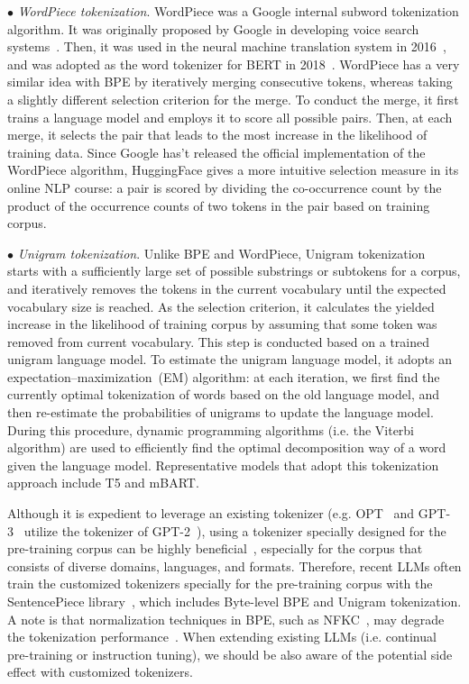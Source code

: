 $\bullet$ \emph{WordPiece tokenization}.  WordPiece was a Google internal subword tokenization algorithm. It was originally proposed by Google in developing voice search systems~\cite{Mike-ICASSP-2012-Japanese}. Then, it was  used in the neural machine translation system in 2016~\cite{Wu-CoRR-2016}, and  was adopted as the word tokenizer for BERT in 2018~\cite{Devlin-NAACL-2019-BERT}.  WordPiece has a very similar idea with BPE by iteratively merging consecutive tokens, whereas taking a slightly different  selection criterion for the merge. To conduct the merge, it first trains a language model and  employs it to score all possible pairs. Then, at each merge, it selects the pair that leads to the most increase in the likelihood of training data. Since Google has't released the official implementation of the WordPiece algorithm, HuggingFace gives a more intuitive selection measure  in its online NLP course: a pair is scored by dividing the co-occurrence count by the product of the occurrence counts of two tokens in the pair based on training corpus.

$\bullet$ \emph{Unigram tokenization}. Unlike BPE and WordPiece, Unigram tokenization~\cite{Kudo-ACL-2018-Subword} starts with a sufficiently large set of  possible substrings or subtokens for a corpus, and iteratively removes the tokens in the current vocabulary until the expected vocabulary size is reached. As the selection criterion, it calculates  the yielded increase in the likelihood of training corpus by assuming that some token was removed from current vocabulary. This step is conducted based on a trained unigram language model. To estimate the unigram language model, it adopts an expectation–maximization~(EM) algorithm: at each iteration, we first find the currently optimal tokenization of words based on the old language model, and then re-estimate the probabilities of unigrams to update the language model. During this procedure, dynamic programming algorithms (i.e. the Viterbi algorithm) are  used to efficiently find the optimal decomposition way of a word given the language model. Representative models that adopt this tokenization approach include T5 and mBART. 

Although it is expedient to leverage an existing tokenizer (e.g. OPT~\cite{Zhang-arxiv-2022-OPT} and GPT-3~\cite{Brown-NeurIPS-2020-Language} utilize the tokenizer of GPT-2~\cite{radford-blog-2019-language}), using a  tokenizer specially designed for the pre-training corpus can be highly beneficial~\cite{Scao-arxiv-2022-BLOOM}, especially for the corpus that consists of diverse domains, languages, and {formats}. Therefore, recent LLMs often train the customized tokenizers specially for the  pre-training corpus with the SentencePiece library~\cite{Kudo-EMNLP-2018-SentencePiece}, which includes Byte-level BPE and Unigram tokenization. A note is that normalization techniques in BPE, such as NFKC~\cite{Davis-arxiv-2001-Unicode}, may  degrade the tokenization performance~\cite{Hoffmann-arxiv-2022-Training,Rae-arxiv-2021-Scaling,Scao-arxiv-2022-BLOOM}. When extending existing LLMs  (i.e. continual pre-training or instruction tuning), we should be also aware of the potential side effect with customized tokenizers.   

